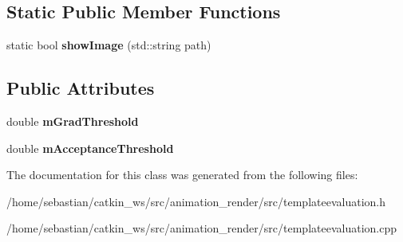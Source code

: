\subsection*{Static Public Member Functions}
\begin{DoxyCompactItemize}
\item 
static bool {\bfseries show\+Image} (std\+::string path)\hypertarget{classTemplateEvaluation_acae88596fe4a036aaef38d204ab0490c}{}\label{classTemplateEvaluation_acae88596fe4a036aaef38d204ab0490c}

\end{DoxyCompactItemize}
\subsection*{Public Attributes}
\begin{DoxyCompactItemize}
\item 
double {\bfseries m\+Grad\+Threshold}\hypertarget{classTemplateEvaluation_a4cab1aa578ca994414f7885f6289c77e}{}\label{classTemplateEvaluation_a4cab1aa578ca994414f7885f6289c77e}

\item 
double {\bfseries m\+Acceptance\+Threshold}\hypertarget{classTemplateEvaluation_aacc5ef9db56038a2ed5a001451c0e36b}{}\label{classTemplateEvaluation_aacc5ef9db56038a2ed5a001451c0e36b}

\end{DoxyCompactItemize}


The documentation for this class was generated from the following files\+:\begin{DoxyCompactItemize}
\item 
/home/sebastian/catkin\+\_\+ws/src/animation\+\_\+render/src/templateevaluation.\+h\item 
/home/sebastian/catkin\+\_\+ws/src/animation\+\_\+render/src/templateevaluation.\+cpp\end{DoxyCompactItemize}
